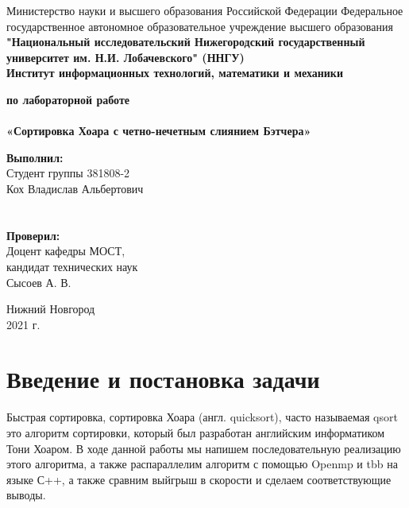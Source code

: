 \documentclass{report}
\begin{document}
\begin{titlepage}

\begin{center}
   
Министерство науки и высшего образования Российской Федерации
{Федеральное государственное автономное образовательное учреждение высшего образования} \\
\textbf{"Национальный исследовательский Нижегородский государственный университет им. Н.И. Лобачевского" (ННГУ)} \\
\textbf{Институт информационных технологий, математики и механики}

\vspace{\fill}

\textbf{ по лабораторной работе \\}
\textbf{\large\\ «Сортировка Хоара с четно-нечетным слиянием Бэтчера»}

\vspace{\fill}

\hfill\parbox{8cm}{
\hspace*{5cm}\hspace*{-5cm}\textbf{Выполнил:} \\ Студент группы 381808-2 \\ Кох Владислав Альбертович \\ \\ \\
\hspace*{5cm}\hspace*{-5cm}\textbf{Проверил:}\\ Доцент кафедры МОСТ, \\ кандидат технических наук \\ Сысоев А. В.
}

\vspace{\fill}

Нижний Новгород \\ 2021 г.
\end{center}

\end{titlepage}

\setcounter{page}{2}
\setlength{\cftsecindent}{0em}
\setlength{\cftsubsecindent}{1.25em}
\setlength{\cftsubsubsecindent}{2.5em}
\setlength{\cftsubsubsecnumwidth}{1.25em}
\tableofcontents


\newpage
\section*{Введение и постановка задачи}
\par Быстрая сортировка, сортировка Хоара (англ. quicksort), часто называемая qsort это алгоритм сортировки, который был разработан английским информатиком Тони Хоаром. В ходе данной работы мы напишем последовательную реализацию этого алгоритма, а также распараллелим алгоритм с помощью Openmp и tbb на языке С++, а также сравним выйгрыш в скорости и сделаем соответствующие выводы.
\end{document}
